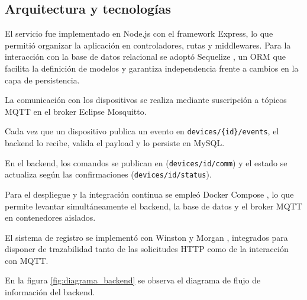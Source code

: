 \subsection{Arquitectura y tecnologías}

El servicio fue implementado en Node.js con el framework Express, lo que permitió organizar la aplicación en controladores, rutas y middlewares. Para la interacción con la base de datos relacional se adoptó Sequelize \cite{sequelize}, un ORM \cite{fowler2002patterns} que facilita la definición de modelos y garantiza independencia frente a cambios en la capa de persistencia.

La comunicación con los dispositivos se realiza mediante suscripción a tópicos MQTT en el broker Eclipse Mosquitto. 

Cada vez que un dispositivo publica un evento en \texttt{devices/\{id\}/events}, 
el backend lo recibe, valida el payload y lo persiste en MySQL.
 
En el backend, los comandos se publican en (\texttt{devices/{id}/comm}) y el estado se actualiza según las confirmaciones (\texttt{devices/{id}/status}). 

Para el despliegue y la integración continua se empleó Docker Compose \cite{docker_compose}, lo que permite levantar simultáneamente el backend, la base de datos y el broker MQTT \cite{mqttSpec} en contenedores aislados.

El sistema de registro se implementó con Winston  \cite{winston} y Morgan \cite{morgan}, integrados para disponer de trazabilidad tanto de las solicitudes HTTP como de la interacción con MQTT.

En la figura \ref{fig:diagrama_backend} se observa el diagrama de flujo de información del backend.


